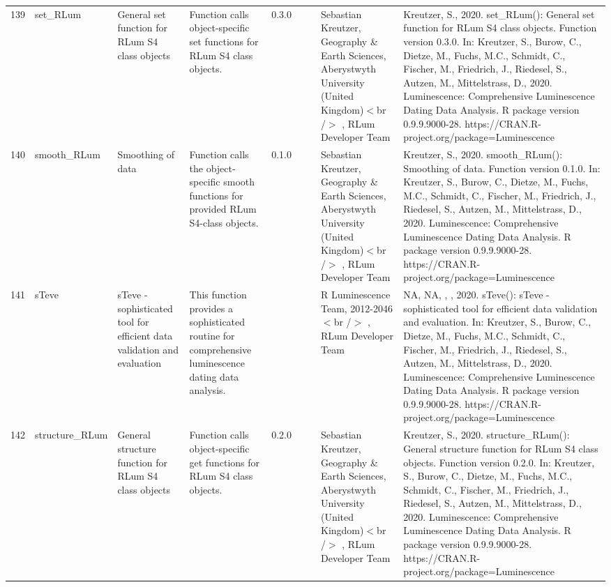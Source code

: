 \begin{table}[ht]
\begin{tabular}{rllllllll}
 \\ 
  139 & set\_RLum & General set function for RLum S4 class objects & Function calls object-specific set functions for RLum S4 class objects. & 0.3.0
 &  &  & Sebastian Kreutzer, Geography \& Earth Sciences, Aberystwyth University (United Kingdom)$<$br /$>$ , RLum Developer Team & Kreutzer, S., 2020. set\_RLum(): General set function for RLum S4 class objects. Function version 0.3.0. In: Kreutzer, S., Burow, C., Dietze, M., Fuchs, M.C., Schmidt, C., Fischer, M., Friedrich, J., Riedesel, S., Autzen, M., Mittelstrass, D., 2020. Luminescence: Comprehensive Luminescence Dating Data Analysis. R package version 0.9.9.9000-28. https://CRAN.R-project.org/package=Luminescence
 \\ 
  140 & smooth\_RLum & Smoothing of data & Function calls the object-specific smooth functions for provided RLum S4-class objects. & 0.1.0
 &  &  & Sebastian Kreutzer, Geography \& Earth Sciences, Aberystwyth University (United Kingdom)$<$br /$>$ , RLum Developer Team & Kreutzer, S., 2020. smooth\_RLum(): Smoothing of data. Function version 0.1.0. In: Kreutzer, S., Burow, C., Dietze, M., Fuchs, M.C., Schmidt, C., Fischer, M., Friedrich, J., Riedesel, S., Autzen, M., Mittelstrass, D., 2020. Luminescence: Comprehensive Luminescence Dating Data Analysis. R package version 0.9.9.9000-28. https://CRAN.R-project.org/package=Luminescence
 \\ 
  141 & sTeve & sTeve - sophisticated tool for efficient data validation and evaluation & This function provides a sophisticated routine for comprehensive luminescence dating data analysis. &  &  &  & R Luminescence Team, 2012-2046$<$br /$>$ , RLum Developer Team & NA, NA, , , 2020. sTeve(): sTeve - sophisticated tool for efficient data validation and evaluation. In: Kreutzer, S., Burow, C., Dietze, M., Fuchs, M.C., Schmidt, C., Fischer, M., Friedrich, J., Riedesel, S., Autzen, M., Mittelstrass, D., 2020. Luminescence: Comprehensive Luminescence Dating Data Analysis. R package version 0.9.9.9000-28. https://CRAN.R-project.org/package=Luminescence
 \\ 
  142 & structure\_RLum & General structure function for RLum S4 class objects & Function calls object-specific get functions for RLum S4 class objects. & 0.2.0
 &  &  & Sebastian Kreutzer, Geography \& Earth Sciences, Aberystwyth University (United Kingdom)$<$br /$>$ , RLum Developer Team & Kreutzer, S., 2020. structure\_RLum(): General structure function for RLum S4 class objects. Function version 0.2.0. In: Kreutzer, S., Burow, C., Dietze, M., Fuchs, M.C., Schmidt, C., Fischer, M., Friedrich, J., Riedesel, S., Autzen, M., Mittelstrass, D., 2020. Luminescence: Comprehensive Luminescence Dating Data Analysis. R package version 0.9.9.9000-28. https://CRAN.R-project.org/package=Luminescence

\end{tabular}
\end{table}
